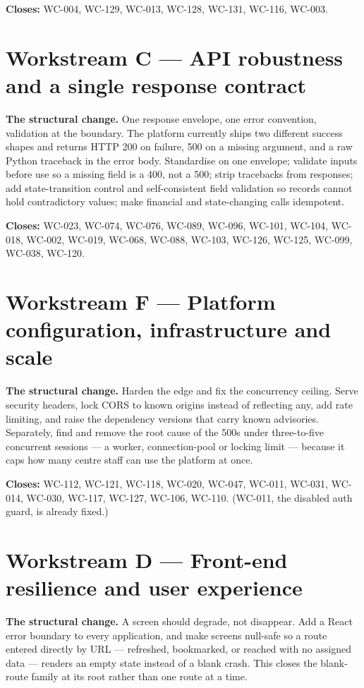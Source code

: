 \documentclass[11pt]{article}
\newcommand{\wc}[1]{\mbox{WC-#1}}
\begin{document}
\textbf{Closes:} \wc{004}, \wc{129}, \wc{013}, \wc{128}, \wc{131}, \wc{116}, \wc{003}.

\section{Workstream C --- API robustness and a single response contract}
\textbf{The structural change.} One response envelope, one error convention, validation at the
boundary. The platform currently ships two different success shapes and returns HTTP 200 on failure,
500 on a missing argument, and a raw Python traceback in the error body. Standardise on one envelope;
validate inputs before use so a missing field is a 400, not a 500; strip tracebacks from responses;
add state-transition control and self-consistent field validation so records cannot hold contradictory
values; make financial and state-changing calls idempotent.

\textbf{Closes:} \wc{023}, \wc{074}, \wc{076}, \wc{089}, \wc{096}, \wc{101}, \wc{104}, \wc{018},
\wc{002}, \wc{019}, \wc{068}, \wc{088}, \wc{103}, \wc{126}, \wc{125}, \wc{099}, \wc{038}, \wc{120}.

\section{Workstream F --- Platform configuration, infrastructure and scale}
\textbf{The structural change.} Harden the edge and fix the concurrency ceiling. Serve security
headers, lock CORS to known origins instead of reflecting any, add rate limiting, and raise the
dependency versions that carry known advisories. Separately, find and remove the root cause of the
500s under three-to-five concurrent sessions --- a worker, connection-pool or locking limit --- because
it caps how many centre staff can use the platform at once.

\textbf{Closes:} \wc{112}, \wc{121}, \wc{118}, \wc{020}, \wc{047}, \wc{011}, \wc{031}, \wc{014},
\wc{030}, \wc{117}, \wc{127}, \wc{106}, \wc{110}. (\wc{011}, the disabled auth guard, is already fixed.)

\section{Workstream D --- Front-end resilience and user experience}
\textbf{The structural change.} A screen should degrade, not disappear. Add a React error boundary to
every application, and make screens null-safe so a route entered directly by URL --- refreshed,
bookmarked, or reached with no assigned data --- renders an empty state instead of a blank crash. This
closes the blank-route family at its root rather than one route at a time.
\end{document}
